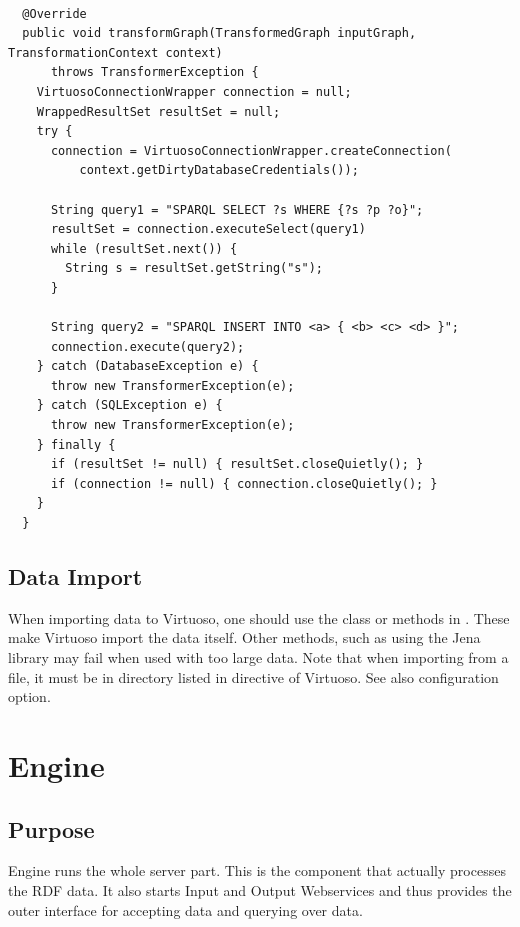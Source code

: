 \begin{lstlisting}[caption={Example of programmatic access to Virtuoso database from a transformer},label=lst:virtuosoConnectionWrapper]

  @Override
  public void transformGraph(TransformedGraph inputGraph, TransformationContext context)
      throws TransformerException {
    VirtuosoConnectionWrapper connection = null;
    WrappedResultSet resultSet = null;
    try {
      connection = VirtuosoConnectionWrapper.createConnection(
          context.getDirtyDatabaseCredentials());

      String query1 = "SPARQL SELECT ?s WHERE {?s ?p ?o}";
      resultSet = connection.executeSelect(query1)
      while (resultSet.next()) {
        String s = resultSet.getString("s");
      }

      String query2 = "SPARQL INSERT INTO <a> { <b> <c> <d> }";
      connection.execute(query2);
    } catch (DatabaseException e) {
      throw new TransformerException(e);
    } catch (SQLException e) {
      throw new TransformerException(e);
    } finally {
      if (resultSet != null) { resultSet.closeQuietly(); }
      if (connection != null) { connection.closeQuietly(); }
    }
  }
\end{lstlisting}

\section{Data Import}
When importing data to Virtuoso, one should use the   class or methods in . These make Virtuoso import the data itself. Other methods, such as using the Jena library may fail when used with too large data. Note that when importing from a file, it must be in directory listed in  directive of Virtuoso. See also  configuration option.

\chapter{Engine}
\section{Purpose}
Engine runs the whole server part. This is the component that actually processes the RDF data. It also starts Input and Output Webservices and thus provides the outer interface for accepting data and querying over data.





